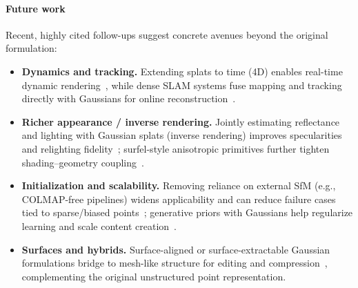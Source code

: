 \begin{enrichment}
\begin{enrichment}
\begin{enrichment}
        \paragraph{Future work}
        Recent, highly cited follow-ups suggest concrete avenues beyond the original formulation:
        \begin{itemize}
            \item \textbf{Dynamics and tracking.} Extending splats to time (4D) enables real-time dynamic rendering~\cite{wu2024_4dgs}, while dense SLAM systems fuse mapping and tracking directly with Gaussians for online reconstruction~\cite{Rosinol_2024_SplaTAM}.
            \item \textbf{Richer appearance / inverse rendering.} Jointly estimating reflectance and lighting with Gaussian splats (inverse rendering) improves specularities and relighting fidelity~\cite{Wang_2024_GSIR}; surfel-style anisotropic primitives further tighten shading–geometry coupling~\cite{Kerbl_2024_GaussianSurfels}.
            \item \textbf{Initialization and scalability.} Removing reliance on external SfM (e.g., COLMAP-free pipelines) widens applicability and can reduce failure cases tied to sparse/biased points~\cite{Fu_2024_COLMAPFreeGS}; generative priors with Gaussians help regularize learning and scale content creation~\cite{tang2023_dreamgaussian}.
            \item \textbf{Surfaces and hybrids.} Surface-aligned or surface-extractable Gaussian formulations bridge to mesh-like structure for editing and compression~\cite{Zhang_2024_SuGaR}, complementing the original unstructured point representation.
        \end{itemize}
        
    \end{enrichment}
        
        
    \end{enrichment}
    

\end{enrichment}

\newpage

